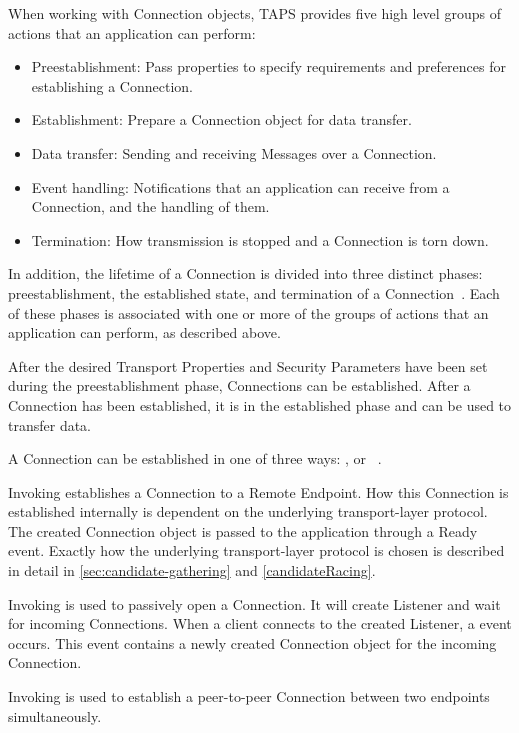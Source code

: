 When working with Connection objects, TAPS provides five high
level groups of actions that an application can perform:
\begin{itemize}
    \item Preestablishment: Pass properties to specify
        requirements and preferences for establishing a Connection.
    \item Establishment: Prepare a Connection object for data
        transfer.
    \item Data transfer: Sending and receiving Messages
        over a Connection.
    \item Event handling: Notifications that an application
        can receive from a Connection, and the handling of them.
    \item Termination: How transmission is stopped and
        a Connection is torn down.
\end{itemize}

In addition, the lifetime of a Connection is divided into three distinct
phases: preestablishment, the established state, and
termination of a Connection~\cite{rfc9621}.
Each of these phases is associated
with one or more of the groups of actions that an application can perform,
as described above. 

After the desired Transport Properties and Security Parameters have
been set during the preestablishment phase, Connections can be established. 
After a Connection has been established, it is in the established phase and can be used to
transfer data. 

A Connection can be established in one of three ways: ,  or 
~\cite{rfc9621}.

Invoking  establishes a Connection to a Remote Endpoint. How this Connection
is established internally is dependent on the underlying transport-layer
protocol. The created Connection object is passed to the application through a Ready event.
Exactly how the underlying transport-layer protocol is chosen is described in detail
in \cref{sec:candidate-gathering} and \cref{candidateRacing}.

Invoking  is used to passively open a Connection. It
will create Listener and wait for incoming Connections.
When a client connects to the created Listener, a 
event occurs. This event contains a newly created Connection object for the 
incoming Connection.

Invoking  is used to establish a peer-to-peer
Connection between two endpoints simultaneously.

